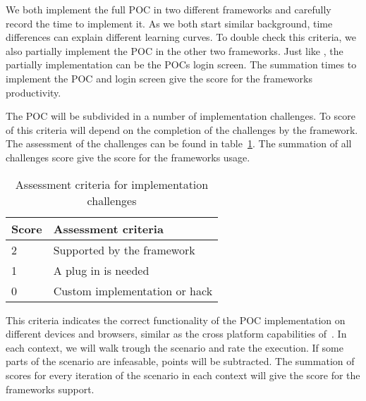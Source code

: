 \documentclass[a4paper]{artikel3}
\renewcommand{\paragraph}[1]{\vspace{2mm} \noindent {\bf #1}  }
\begin{document}
\paragraph{Productivity}%
We both implement the full POC in two different frameworks and carefully record the time to implement it.  As we both start similar background,  time differences can explain different learning curves.  To double check this criteria,  we also partially implement the POC in the other two frameworks.  Just like \cite{Burris},  the partially implementation can be the POCs login screen.  
The summation times to implement the POC and login screen give the score for the frameworks productivity.  

\paragraph{Usage}%
The POC will be subdivided in a number of implementation challenges.  To score of this criteria will depend on the completion of the challenges by the framework.  The assessment of the challenges can be found in table~\ref{table:challenges-scores}.  The summation of all challenges score give the score for the frameworks usage.

\begin{table}[h]
\centering
\begin{tabular}{l|l}
\textbf{Score} & \textbf{Assessment criteria}\\
  \hline \hline
2 & Supported by the framework\\
1 & A plug in is needed\\
0 & Custom implementation or hack\\
\end{tabular}
\caption{Assessment criteria for implementation challenges}
\label{table:challenges-scores}
\end{table}

\paragraph{Support}%
This criteria indicates the correct functionality of the POC implementation on different devices and browsers,  similar as the cross platform capabilities of~\cite{Sarrafi2012a}.  In each context,  we will walk trough the scenario and rate the execution.  If some parts of the scenario are infeasable,  points will be subtracted.  The summation of scores for every iteration of the scenario in each context will give the score for the frameworks support.
\end{document}
